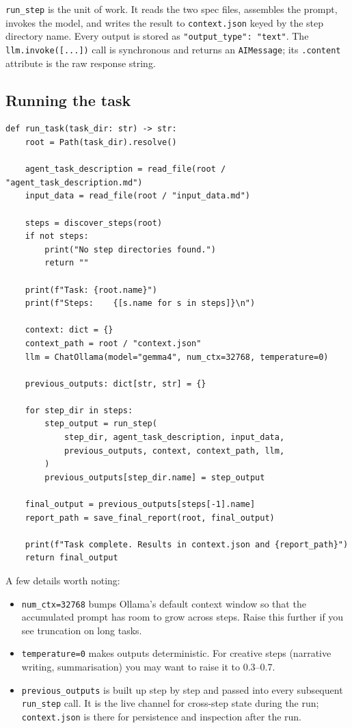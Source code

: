 \documentclass[12pt, a4paper]{article}
\begin{document}
\texttt{run\_step} is the unit of work. It reads the two spec files, assembles the prompt, invokes the model, and writes the result to \texttt{context.json} keyed by the step directory name. Every output is stored as \texttt{"output\_type": "text"}. The \texttt{llm.invoke([...])} call is synchronous and returns an \texttt{AIMessage}; its \texttt{.content} attribute is the raw response string.

\subsection{Running the task}

\begin{lstlisting}[style=pythonstyle]
def run_task(task_dir: str) -> str:
    root = Path(task_dir).resolve()

    agent_task_description = read_file(root / "agent_task_description.md")
    input_data = read_file(root / "input_data.md")

    steps = discover_steps(root)
    if not steps:
        print("No step directories found.")
        return ""

    print(f"Task: {root.name}")
    print(f"Steps:    {[s.name for s in steps]}\n")

    context: dict = {}
    context_path = root / "context.json"
    llm = ChatOllama(model="gemma4", num_ctx=32768, temperature=0)

    previous_outputs: dict[str, str] = {}

    for step_dir in steps:
        step_output = run_step(
            step_dir, agent_task_description, input_data,
            previous_outputs, context, context_path, llm,
        )
        previous_outputs[step_dir.name] = step_output

    final_output = previous_outputs[steps[-1].name]
    report_path = save_final_report(root, final_output)

    print(f"Task complete. Results in context.json and {report_path}")
    return final_output
\end{lstlisting}

A few details worth noting:

\begin{itemize}[leftmargin=1.5em]
  \item \texttt{num\_ctx=32768} bumps Ollama's default context window so that the accumulated prompt has room to grow across steps. Raise this further if you see truncation on long tasks.
  \item \texttt{temperature=0} makes outputs deterministic. For creative steps (narrative writing, summarisation) you may want to raise it to 0.3--0.7.
  \item \texttt{previous\_outputs} is built up step by step and passed into every subsequent \texttt{run\_step} call. It is the live channel for cross-step state during the run; \texttt{context.json} is there for persistence and inspection after the run.
\end{itemize}
\end{document}
